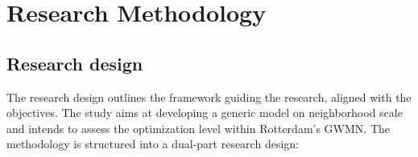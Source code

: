 \chapter{Research Methodology}
\label{chapter:RM}


\section{Research design}
The research design outlines the framework guiding the research, aligned with the objectives. The study aims at developing a generic model on neighborhood scale and intends to assess the optimization level within Rotterdam's GWMN. The methodology is structured into a dual-part research design: 


